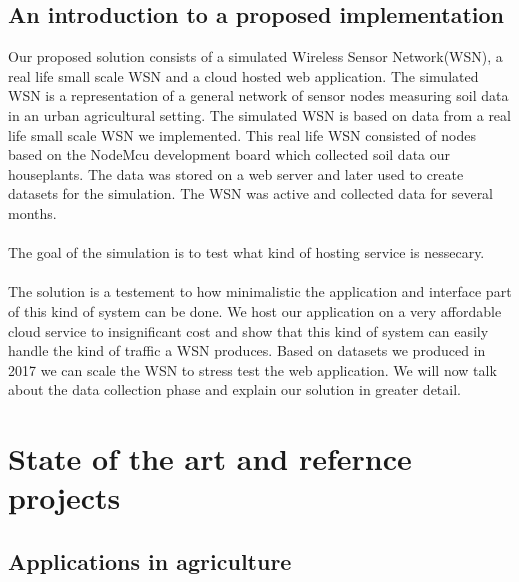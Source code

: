 \documentclass[]{uiophd}
\begin{document}
\section{An introduction to a proposed implementation}
Our proposed solution consists of a simulated Wireless Sensor Network(WSN), a real life small scale WSN and a cloud hosted web application. The simulated WSN is a representation of a general network of sensor nodes measuring soil data in an urban agricultural setting. The simulated WSN is based on data from a real life small scale WSN we implemented. This real life WSN consisted of nodes based on the NodeMcu development board which collected soil data our houseplants. The data was stored on a web server and later used to create datasets for the simulation. The WSN was active and collected data for several months. 
\\\\
The goal of the simulation is to test what kind of hosting service is nessecary.
\\\\
The solution is a testement to how minimalistic the application and interface part of this kind of system can be done. We host our application on a very affordable cloud service to insignificant cost and show that this kind of system can easily handle the kind of traffic a WSN produces. Based on datasets we produced in 2017 we can scale the WSN to stress test the web application. We will now talk about the data collection phase and explain our solution in greater detail.



\chapter{State of the art and refernce projects}

\section{Applications in agriculture}
\end{document}
